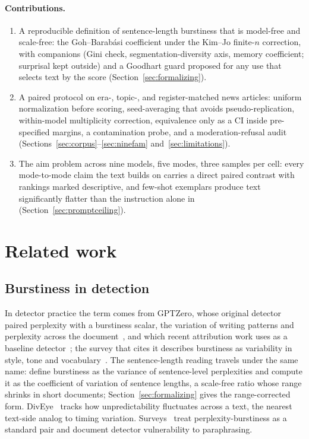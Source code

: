 \documentclass{article}
\begin{document}
\paragraph{Contributions.}
\begin{enumerate}
\item A reproducible definition of sentence-length burstiness that is
model-free and scale-free: the Goh--Barab\'asi coefficient under the Kim--Jo
finite-$n$ correction, with companions (Gini check, segmentation-diversity
axis, memory coefficient; surprisal kept outside) and a Goodhart guard proposed
for any use that selects text by the score (Section~\ref{sec:formalizing}).
\item A paired protocol on era-, topic-, and register-matched news articles:
uniform normalization before scoring, seed-averaging that avoids
pseudo-replication, within-model multiplicity correction, equivalence only as a
CI inside pre-specified margins, a contamination probe,
and a moderation-refusal audit (Sections~\ref{sec:corpus}--\ref{sec:ninefam} and~\ref{sec:limitations}).
\item The aim problem across nine models, five modes, three samples per cell:
every mode-to-mode claim the text builds on carries a direct paired contrast
with rankings marked descriptive, and
few-shot exemplars produce text significantly flatter than the instruction
alone in  (Section~\ref{sec:promptceiling}).
\end{enumerate}

\section{Related work}\label{sec:related}

\subsection{Burstiness in detection}
In detector practice the term comes from GPTZero, whose original detector paired perplexity with a
burstiness scalar, the variation of writing patterns and perplexity across the
document~\citep{gptzero2023burstiness}, and which recent attribution work uses as a baseline detector~\citep{arxiv2025training}; the
survey that cites it describes burstiness as variability in style, tone and
vocabulary~\citep{arxiv2024detecting}. The sentence-length reading travels under the same name:
\citet{onan2025you} define burstiness as the variance of sentence-level perplexities and compute
it as the coefficient of variation of sentence lengths, a scale-free ratio whose range
shrinks in short documents; Section~\ref{sec:formalizing} gives the range-corrected form.
DivEye~\citep{arxiv2025diveye} tracks how unpredictability fluctuates across a text, the nearest
text-side analog to timing variation. Surveys~\citep{arxiv2024detecting} treat
perplexity-burstiness as a standard pair and document detector vulnerability to paraphrasing.
\end{document}
